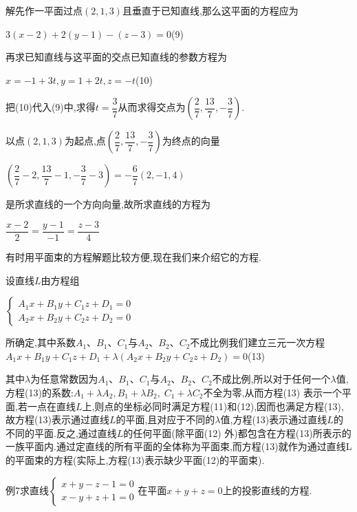 \documentclass[oneside]{book}
\begin{document}
解先作一平面过点$(2,1,3)$且垂直于已知直线,那么这平面的方程应为

$3(x - 2) + 2\left( {y - 1} \right) - \left( {z - 3} \right) = 0$(9)

再求已知直线与这平面的交点已知直线的参数方程为

$x =  - 1 + 3t,y = 1 + 2t,z =  - t$(10)

把(10)代入(9)中,求得$t = \dfrac{3}{7}$从而求得交点为$\left( {\dfrac{2}{7},\dfrac{{13}}{7}, - \dfrac{3}{7}} \right)$.

以点$(2,1,3)$为起点,点$\left( {\dfrac{2}{7},\dfrac{{13}}{7}, - \dfrac{3}{7}} \right)$为终点的向量

$\left( {\dfrac{2}{7} - 2,\dfrac{{13}}{7} - 1, - \dfrac{3}{7} - 3} \right) =  - \dfrac{6}{7}(2, - 1,4)$

是所求直线的一个方向向量,故所求直线的方程为

$\dfrac{{x - 2}}{2} = \dfrac{{y - 1}}{{ - 1}} = \dfrac{{z - 3}}{4}$

有时用平面束的方程解题比较方便,现在我们来介绍它的方程.

设直线$L$由方程组

$\left\{\begin{array}{l}{A_{1} x+B_{1} y+C_{1} z+D_{1}=0} \\ {A_{2} x+B_{2} y+C_{2} z+D_{2}=0}\end{array}\right.$

所确定,其中系数${A_1}$、${B_1}$、${C_1}$与${A_2}$、${B_2}$、${C_2}$不成比例我们建立三元一次方程${A_1}x + {B_1}y + {C_1}z + {D_1} + \lambda \left( {{A_2}x + {B_2}y + {C_2}z + {D_2}} \right) = 0$(13)

其中$\lambda $为任意常数因为${A_1}$、${B_1}$、${C_1}$与${A_2}$、${B_2}$、${C_2}$不成比例,所以对于任何一个$\lambda $值,方程(13)的系数:${A_1} + \lambda {A_2},{B_1} + \lambda {B_2},\;{C_1} + \lambda {C_2}$不全为零,从而方程(13)
表示一个平面,若一点在直线$L$上,则点的坐标必同时满足方程(11)和(12),因而也满足方程(13),故方程(13)表示通过直线$L$的平面,且对应于不同的$\lambda $值,方程(13)表示通过直线$L$的不同的平面.反之,通过直线$L$的任何平面(除平面(12)
外)都包含在方程(13)所表示的一族平面内.通过定直线的所有平面的全体称为平面束,而方程(13)就作为通过直线L的平面束的方程(实际上,方程(13)表示缺少平面(12)的平面束).

例7求直线$\left\{\begin{array}{l}{x+y-z-1=0} \\ {x-y+z+1=0}\end{array}\right.$在平面$x + y + z = 0$上的投影直线的方程.
\end{document}
